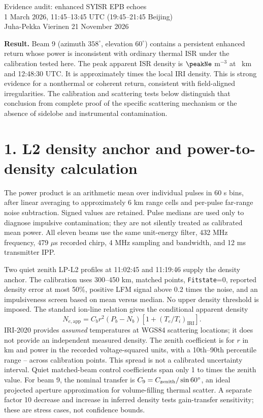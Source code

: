\documentclass[11pt,a4paper]{article}
\begin{document}
\begin{center}{\Large Evidence audit: enhanced SYISR EPB echoes}\\[5pt]
1 March 2026, 11:45--13:45 UTC (19:45--21:45 Beijing)\\
Juha-Pekka Vierinen \hfill 21 November 2026\end{center}
\textbf{Result.} Beam 9 (azimuth $358^\circ$, elevation $60^\circ$) contains a
persistent enhanced return whose power is inconsistent with ordinary thermal
ISR under the calibration tested here. The peak apparent ISR density is
$\peakNe$ m$^{-3}$ at \peakHeight~km and 12:48:30 UTC. It is approximately
\iriExcess{} times the local IRI density. This is strong evidence for a
nonthermal or coherent return, consistent with field-aligned irregularities.
The calibration and scattering tests below distinguish that conclusion from
complete proof of the specific scattering mechanism or the absence of sidelobe
and instrumental contamination.

\section*{1. L2 density anchor and power-to-density calculation}
The power product is an arithmetic mean over individual pulses in 60 s bins,
after linear averaging to approximately 6 km range cells and per-pulse
far-range noise subtraction. Signed values are retained. Pulse medians are
used only to diagnose impulsive contamination; they are not silently treated
as calibrated mean power. All eleven beams use the same unit-energy filter,
432 MHz frequency, 479 $\mu$s recorded chirp, 4 MHz sampling and bandwidth,
and 12 ms transmitter IPP.

Two quiet zenith LP-L2 profiles at 11:02:45 and 11:19:46 supply the density
anchor. The calibration uses 300--450 km, \calibrationCount{} matched points,
\texttt{Fitstate}=0, reported density error at most 50\%, positive LFM signal
above 0.2 times the noise, and an impulsiveness screen based on mean versus
median. No upper density threshold is imposed. The standard ion-line relation
\cite{Yue2023} gives the conditional apparent density
\begin{equation}
 N_{e,\mathrm{app}}=C_b r^2(P_b-N_b)
             \left[1+(T_e/T_i)_{\mathrm{IRI}}\right].
\end{equation}
IRI-2020 provides \emph{assumed} temperatures at WGS84 scattering locations;
it does not provide an independent measured density. The zenith coefficient
is \coefficient{} for $r$ in km and power in the recorded voltage-squared
units, with a 10th--90th percentile
range \coefficientLow--\coefficientHigh{} across calibration points. This
spread is not a calibrated uncertainty interval. Quiet matched-beam control
coefficients span only 1 to \controlMax{} times the zenith value. For beam 9,
the nominal transfer is $C_9=C_{\rm zenith}/\sin60^\circ$, an ideal projected
aperture approximation for volume-filling thermal scatter. A separate factor
10 decrease and increase in inferred density tests gain-transfer sensitivity;
these are stress cases, not confidence bounds.
\end{document}
